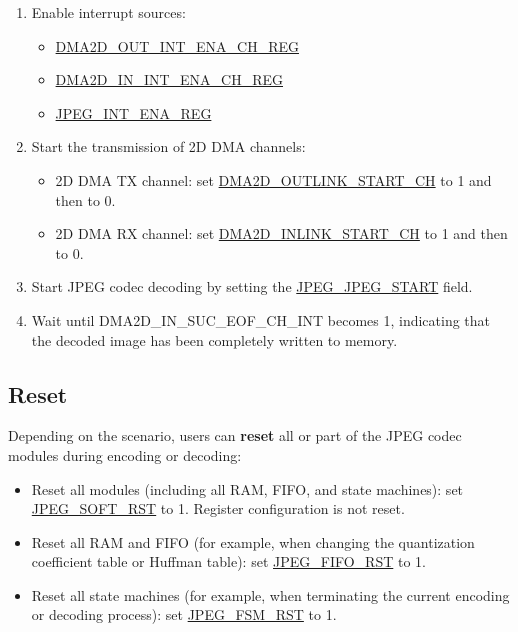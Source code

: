 \documentclass[main\_\_EN.tex]{subfiles}
\begin{document}
\begin{enumerate}
\begin{enumerate}
\begin{itemize}
            \item 2D DMA RX channel: \hyperref[fielddesc:DMA2DINLINKADDRCHN]{DMA2D\_INLINK\_ADDR\_CH}
        \end{itemize}
    \end{enumerate}
    \item Enable interrupt sources:
    \begin{itemize}
        \item \hyperref[regdesc:DMA2DOUTINTENACHNREG]{DMA2D\_OUT\_INT\_ENA\_CH\_REG}
        \item \hyperref[regdesc:DMA2DININTENACHNREG]{DMA2D\_IN\_INT\_ENA\_CH\_REG}
        \item \hyperref[regdesc:JPEGINTENAREG]{JPEG\_INT\_ENA\_REG}
    \end{itemize}
    \item Start the transmission of 2D DMA channels:
    \begin{itemize}
        \item 2D DMA TX channel: set \hyperref[fielddesc:DMA2DOUTLINKSTARTCHN]{DMA2D\_OUTLINK\_START\_CH} to 1 and then to 0.
        \item 2D DMA RX channel: set \hyperref[fielddesc:DMA2DINLINKSTARTCHN]{DMA2D\_INLINK\_START\_CH} to 1 and then to 0.
    \end{itemize}
    \item Start JPEG codec decoding by setting the \hyperref[fielddesc:JPEGJPEGSTART]{JPEG\_JPEG\_START} field.
    \item Wait until DMA2D\_IN\_SUC\_EOF\_CH\_INT becomes 1, indicating that the decoded image has been completely written to memory.
\end{enumerate}

\subsection{Reset}

Depending on the scenario, users can \textbf{reset} all or part of the JPEG codec modules during encoding or decoding:
\begin{itemize}
    \item Reset all modules (including all RAM, FIFO, and state machines): set \hyperref[fielddesc:JPEGSOFTRST]{JPEG\_SOFT\_RST} to 1. Register configuration is not reset.
    \item Reset all RAM and FIFO (for example, when changing the quantization coefficient table or Huffman table): set \hyperref[fielddesc:JPEGFIFORST]{JPEG\_FIFO\_RST} to 1.
    \item Reset all state machines (for example, when terminating the current encoding or decoding process): set \hyperref[fielddesc:JPEGFSMRST]{JPEG\_FSM\_RST} to 1.
\end{itemize}
\end{document}
